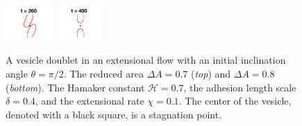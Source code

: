 \documentclass[prf,superscriptaddress,showpacs]{revtex4-1}
\begin{document}
\begin{figure}
  \includegraphics[width = 0.16\textwidth,trim={4cm 2cm 4cm 1cm},clip]{figs/extensional_adR4em1adS7em1Chi1em1_ra080_image04.png}
  \includegraphics[width = 0.16\textwidth,trim={4cm 2cm 4cm 1cm},clip]{figs/extensional_adR4em1adS7em1Chi1em1_ra080_image05.png}
  \caption{\label{fig:extensional3} A vesicle doublet in an extensional flow with an initial inclination angle $\theta=\pi/2$.
  The reduced area $\Delta A = 0.7$ ({\em top}) and $\Delta A=0.8$ ({\em bottom}). The Hamaker constant $\mathcal{H} =
  0.7$, the adhesion length scale $\delta = 0.4$, and the extensional
  rate $\chi = 0.1$.  The center of the vesicle, denoted with a black
  square, is a stagnation point.}
  \end{figure}
\end{document}
